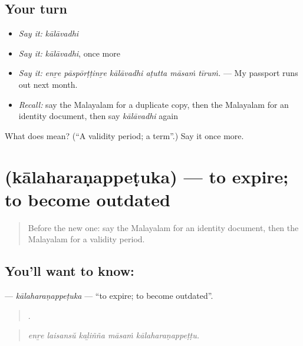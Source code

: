 \subsection*{Your turn}
\begin{itemize}
\raggedright
  \item \emph{Say it:} \emph{kālāvadhi}
  \item \emph{Say it:} \emph{kālāvadhi}, once more
  \item \emph{Say it:} \emph{enṟe pāspōrṭṭinṟe kālāvadhi aṭutta māsaṁ tīruṁ.} — My passport runs out next month.
  \item \emph{Recall:} say the Malayalam for a duplicate copy, then the Malayalam for an identity document, then say \emph{kālāvadhi} again
\end{itemize}

\begin{tcolorbox}[breakable,colback=teal!4,colframe=teal!35!black,title={Before you move on}]
What does  mean? (\textquotedblleft{}A validity period; a term\textquotedblright{}.) Say it once more.
\end{tcolorbox}
\section[\texorpdfstring{\ml{കാലഹരണപ്പെടുക} (kālaharaṇappeṭuka)}{കാലഹരണപ്പെടുക (kālaharaṇappeṭuka)}]{ (kālaharaṇappeṭuka) — to expire; to become outdated}

\label{lesson:ML-C488-kalaharanappetuka}



\begin{quote}
Before the new one: say the Malayalam for an identity document, then the Malayalam for a validity period.
\end{quote}

\subsection*{You'll want to know: }
\textbf{} — \emph{kālaharaṇappeṭuka} — \textquotedblleft{}to expire; to become outdated\textquotedblright{}.

\begin{quote}
    .
\end{quote}

\begin{quote}
\emph{enṟe laisansŭ kaḻiñña māsaṁ kālaharaṇappeṭṭu.}
\end{quote}

